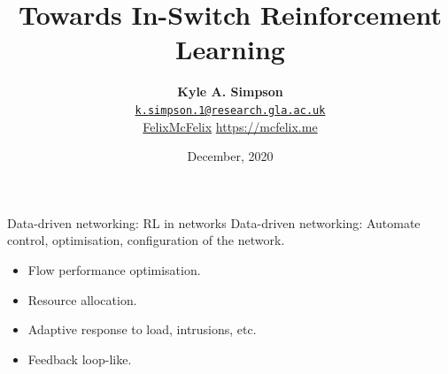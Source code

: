 \documentclass[aspectratio=169,xcolor={dvipsnames}
]{beamer}
\title{Towards In-Switch Reinforcement Learning}
\author{\vspace{-1em}\textbf{Kyle A. Simpson}\\
	\faEnvelopeO{} \href{mailto:k.simpson.1@research.gla.ac.uk}{\nolinkurl{k.simpson.1@research.gla.ac.uk}}\\
	\vspace{1em}\small{\faGithub{} \href{https://github.com/felixmcfelix}{FelixMcFelix} \hspace{0.5em} \faGlobe{} \url{https://mcfelix.me}}}
\institute{University of Glasgow}
\date{\nth{2} December, 2020}
\begin{document}
\begin{frame}
\maketitle
\end{frame}

\begin{frame}{Data-driven networking: RL in networks}
	\alert{Data-driven networking}: Automate control, optimisation, configuration of the network.
	\begin{itemize}
		\item Flow performance optimisation.
		\item Resource allocation.
		\item Adaptive response to load, intrusions, etc.
		\item Feedback loop-like.
	\end{itemize}
\end{frame}
\end{document}

